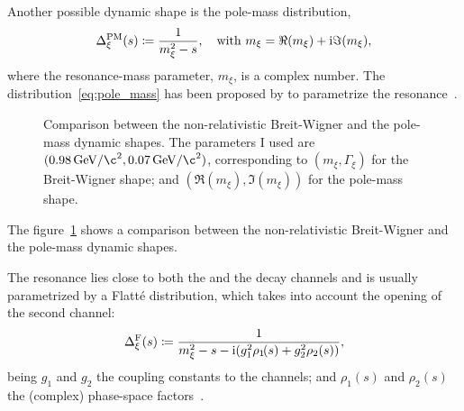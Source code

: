     Another possible dynamic shape is the pole-mass distribution,
    \begin{equation}\label{eq:pole_mass}
        \Delta_{\xi}^{\text{PM}}(s) \coloneqq \frac{1}{m_{\xi}^2 - s},\quad
        \text{with }m_\xi = \Re (m_\xi) + \mathrm{i}\Im(m_\xi),
    \end{equation}
    where the resonance-mass parameter, $m_\xi$, is a complex number.
    The distribution~\eqref{eq:pole_mass} has been proposed by \citeauthor{PhysRevD.71.054030} to parametrize the \Psigma{} resonance~\cite{PhysRevD.71.054030}.
    \begin{figure}
        \centering
        
        \caption{Comparison between the non-relativistic Breit-Wigner and the pole-mass dynamic shapes. The parameters I used are $(\SI{.98}{\giga\electronvolt/\c^2}, \SI{.07}{\giga\electronvolt/\c^2})$, corresponding to $(m_\xi,\Gamma_\xi)$ for the Breit-Wigner shape; and $(\Re(m_\xi),\Im(m_\xi))$ for the pole-mass shape.}
        \label{fig:bw_pm_comparison}
    \end{figure}
    The figure~\ref{fig:bw_pm_comparison} shows a comparison between the non-relativistic Breit-Wigner and the pole-mass dynamic shapes.

    
    The \Pfnez{} resonance lies close to both the \Ppiplus{}\Ppiminus{} and the \PKplus{}\PKminus{} decay channels and is usually parametrized by a Flatté distribution, which takes into account the opening of the second channel:
    \begin{equation}\label{eq:flatte}
        \Delta_{\xi}^{\text{F}}(s) \coloneqq \frac{1}{m_{\xi}^2 - s - \mathrm{i}(g_1^2 \rho_{1\!}(s)  + g_2^2 \rho_2(s))},
    \end{equation}
    being $g_1$ and $g_2$ the coupling constants to the channels;
    and $\rho_{1\!}(s)$ and $\rho_2(s)$ the (complex) phase-space factors~\cite{FLATTE1976224}.

